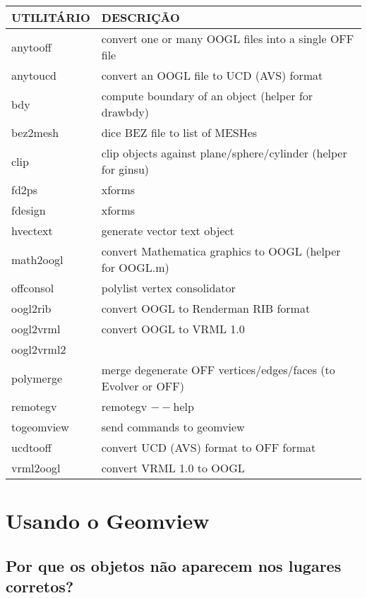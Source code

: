 \documentclass[12pt,a4paper]{article}
\begin{document}
        \begin{center}
        \begin{tabular}{|l|p{8cm}|}
        \\ \hline
        UTILIT\'ARIO & DESCRI\c{C}\~AO  \\ \hline
        anytooff & convert one or many OOGL files into a single OFF file  \\ \hline
        anytoucd & convert an OOGL file to UCD (AVS) format  \\ \hline
        bdy & compute boundary of an object (helper for drawbdy)  \\ \hline
        bez2mesh & dice BEZ file to list of MESHes  \\ \hline
        clip & clip objects against plane/sphere/cylinder (helper for ginsu)  \\ \hline
        fd2ps & xforms  \\ \hline
        fdesign & xforms  \\ \hline
        hvectext & generate vector text object  \\ \hline
        math2oogl & convert Mathematica graphics to OOGL (helper for OOGL.m)  \\ \hline
        offconsol & polylist vertex consolidator  \\ \hline
        oogl2rib & convert OOGL to Renderman RIB format  \\ \hline
        oogl2vrml & convert OOGL to VRML 1.0  \\ \hline
        oogl2vrml2 &   \\ \hline
        polymerge & merge degenerate OFF vertices/edges/faces (to Evolver or OFF)  \\ \hline
        remotegv &  remotegv $--$help  \\ \hline
        togeomview & send commands to geomview  \\ \hline
        ucdtooff & convert UCD (AVS) format to OFF format  \\ \hline
        vrml2oogl & convert VRML 1.0 to OOGL  \\ \hline
        \end{tabular}
	\end{center}

\section{Usando o Geomview}

    \subsection{Por que os objetos n\~ao aparecem nos lugares corretos?}
\end{document}
